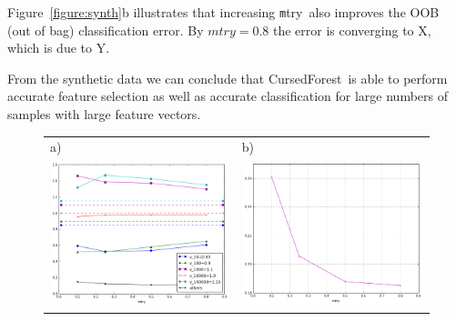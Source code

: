 \documentclass[10pt,letterpaper]{article}
\newcommand{\cursedforest}{{\sc CursedForest}}
\newcommand{\mtry}{{\texttt mtry}}
\begin{document}
Figure~\ref{figure:synth}b illustrates that increasing \mtry\ also improves the OOB (out of bag) classification error.
By $mtry=0.8$ the error is converging to X, which is due to Y.

From the synthetic data we can conclude that \cursedforest\ is able to perform accurate feature selection as well as
accurate classification for large numbers of samples with large feature vectors.

\begin{figure}[tbph]
\begin{adjustwidth}{-1.00in}{0in}
\begin{tabular}{ll}
a)& b)\\
\includegraphics[totalheight=6cm]{./figs/var_oder.png} & 
\includegraphics[totalheight=6cm]{./figs/var_oob.png} \\

\end{tabular}
\end{adjustwidth}
\end{figure}
\end{document}
